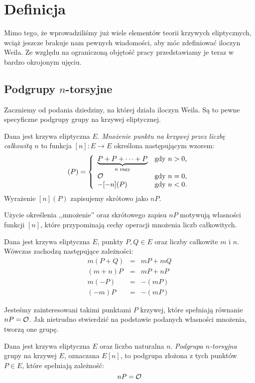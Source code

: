 \section{Definicja}

Mimo tego, że wprowadziliśmy już
wiele elementów teorii krzywych eliptycznych,
wciąż jeszcze brakuje nam pewnych wiadomości,
aby móc zdefiniować iloczyn Weila.
Ze względu na ograniczoną objętość pracy
przedstawiamy je teraz
w bardzo okrojonym ujęciu.

\subsection*{Podgrupy $n$-torsyjne}

Zaczniemy od podania dziedziny,
na której działa iloczyn Weila.
Są to pewne specyficzne podgrupy
grupy na krzywej eliptycznej.

\begin{definition}
Dana jest krzywa eliptyczna $E$.
\emph{Mnożenie punktu na krzywej przez liczbę całkowitą $n$}
to funkcja $[n] \colon E \to E$
określona następującym wzorem:
\begin{equation}
[n](P) =
\fundefthree
{\underbrace{P + P + \cdots + P}_{n\textrm{ razy}}}{n > 0}
{\ecident}{n = 0}
{-[-n](P)}{n < 0}
\end{equation}
Wyrażenie $[n](P)$ zapisujemy skrótowo jako $nP$.
\end{definition}

Użycie określenia ,,mnożenie'' oraz skrótowego zapisu $nP$
motywują własności funkcji $[n]$,
które przypominają cechy operacji mnożenia liczb całkowitych.

\begin{fact}
Dana jest krzywa eliptyczna $E$, punkty $P, Q \in E$
oraz liczby całkowite $m$ i $n$.
Wówczas zachodzą następujące zależności:
\begin{eqnarray*}
m(P + Q) & = & mP + mQ \\
(m + n)P & = & mP + nP \\
m(-P) & = & -(mP) \\
(-m)P & = & -(mP)
\end{eqnarray*}
\end{fact}

Jesteśmy zainteresowani takimi punktami $P$ krzywej,
które spełniają równanie $nP = \mathcal{O}$.
Jak nietrudno stwierdzić na podstawie podanych własności mnożenia,
tworzą one grupę.

\begin{definition}
Dana jest krzywa eliptyczna $E$
oraz liczba naturalna $n$.
\emph{Podgrupa $n$-torsyjna} grupy na krzywej $E$,
oznaczana $E[n]$,
to podgrupa złożona z tych punktów $P \in E$,
które spełniają zależność:
\begin{equation}
nP = \mathcal{O}
\end{equation}
\end{definition}

